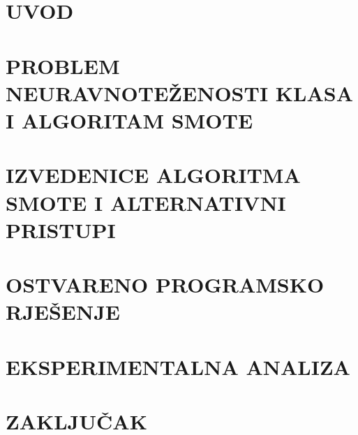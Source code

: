 \documentclass[a4paper,12pt,oneside]{article}
\begin{document}
\newpage

\section{UVOD}


\section{PROBLEM NEURAVNOTE\v{Z}ENOSTI KLASA I ALGORITAM SMOTE}


\section{IZVEDENICE ALGORITMA SMOTE I ALTERNATIVNI PRISTUPI}


\section{OSTVARENO PROGRAMSKO RJE\v{S}ENJE}


\section{EKSPERIMENTALNA ANALIZA}


\section{ZAKLJU\v{C}AK}

\end{document}
